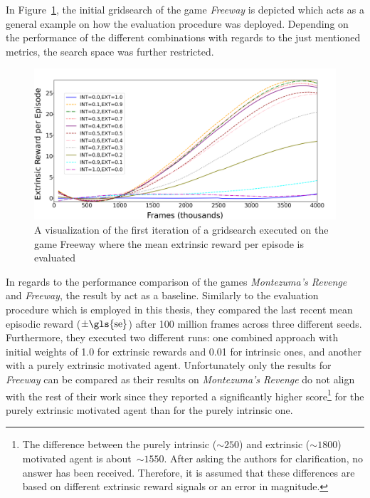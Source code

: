 \documentclass[draft,final]{vutinfth} %
\begin{document}
    In Figure~\ref{fig:gridsearch_evaluation}, the initial gridsearch of the game \textit{Freeway} is depicted which acts as a general example on how the evaluation procedure was deployed.
    Depending on the performance of the different combinations with regards to the just mentioned metrics, the search space was further restricted.

    \begin{figure}[h]
        \centering
        \includegraphics[width=1\textwidth]{figures/example_grid_search.png}
        \caption[A visualization of the first iteration of an executed gridsearch for the game Freeway]{A visualization of the first iteration of a gridsearch executed on the game Freeway where the mean extrinsic reward per episode is evaluated}
        \label{fig:gridsearch_evaluation}
    \end{figure}

    In regards to the performance comparison of the games \textit{Montezuma's Revenge} and \textit{Freeway}, the result by \citet[see Table 2]{burda_large-scale_2018-1} act as a baseline.
    Similarly to the evaluation procedure which is employed in this thesis, they compared the last recent mean episodic reward ($\pm\text{\gls{se}}$) after 100 million frames across three different seeds.
    Furthermore, they executed two different runs: one combined approach with initial weights of 1.0 for extrinsic rewards and 0.01 for intrinsic ones, and another with a purely extrinsic motivated agent.
    Unfortunately only the results for \textit{Freeway} can be compared as their results on \textit{Montezuma's Revenge} do not align with the rest of their work since they reported a significantly higher score\footnote{The difference between the purely intrinsic ($\sim250$) and extrinsic ($\sim1800$) motivated agent is about~$\sim1550$. After asking the authors \citet{burda_large-scale_2018-1} for clarification, no answer has been received. Therefore, it is assumed that these differences are based on different extrinsic reward signals or an error in magnitude.} for the purely extrinsic motivated agent than for the purely intrinsic one.
\end{document}
